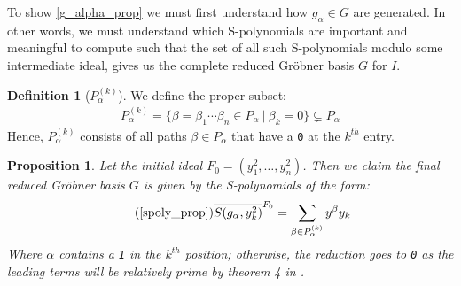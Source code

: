 \documentclass[12pt,reqno]{amsart}
\theoremstyle{plain}
\newtheorem{proposition}[theorem]{Proposition}
\theoremstyle{definition}
\newtheorem{definition}[theorem]{Definition}
\begin{document}
To show \ref{g_alpha_prop} we must first understand how $g_{\alpha} \in G$ are generated. In other words, we must understand which S-polynomials are important and
	meaningful to compute such that the set of all such S-polynomials modulo some intermediate ideal, gives us the complete reduced Gr\"obner basis
	$G$ for $I$.

\begin{definition}[$P^{(k)}_{\alpha}$] \label{p_alpha_k}
	We define the proper subset:
	\begin{align*}
		P_\alpha^{(k)} = \{\beta = \beta_1 \cdots \beta_n \in P_\alpha \ | \ \beta_k = 0\} \subsetneq P_\alpha
	\end{align*}
	Hence, $P_\alpha^{(k)}$ consists of all paths $\beta \in P_\alpha$ that have a \texttt{0} at the 
	$k^{th}$ entry. 
\end{definition}

\begin{proposition} 
	\label{spoly_prop}
	Let the initial ideal $F_0 = (y^2_1, \dots, y^2_n)$. Then we claim the final reduced Gr\"obner basis $G$ 
	is given by the S-polynomials of the form:
	\begin{equation}
		\tag{\ref*{spoly_prop}}
		\overline{S(g_\alpha, y^2_k)}^{F_0} = \sum_{\beta \in P^{(k)}_{\alpha}} y^{\beta}y_k
	\end{equation}
	Where $\alpha$ contains a \texttt{1} in the $k^{th}$ position; otherwise, the reduction goes to \texttt{0} as the leading terms will be relatively prime by theorem 4 in \cite[\S 2.9]{iva}. 
\end{proposition}
\end{document}
